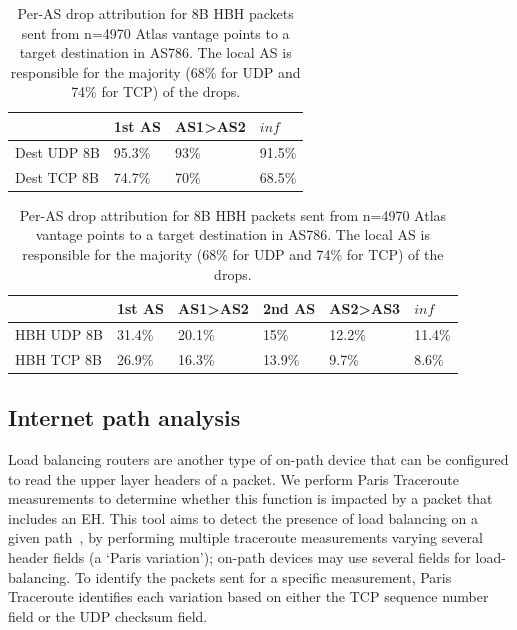 \documentclass[conference]{IEEEtran}
\begin{document}
\begin{table}
\centering
\caption{Per-AS drop attribution for 8B DST packets sent from n=4970 Atlas vantage points to a target destination in AS786. The local AS is responsible for the majority (5\% for UDP and 25\% for TCP) of the drops.}
 \label{tbl:uk_as1}

\begin{tabular}{l|l|l|l}
                                   & 1st AS & AS1\textgreater AS2 & $inf $     \\ \hline 

{Dest UDP 8B} & 95.3\% & 93\%                 & 91.5\% \\ \hline

{Dest TCP 8B} & 74.7\% & 70\%                 & 68.5\%
\end{tabular}
\bigskip
\caption{Per-AS drop attribution for 8B HBH packets sent from n=4970  Atlas vantage points to a target destination in AS786. The local AS is responsible for the majority (68\% for UDP and 74\% for TCP) of the drops.}
\begin{tabular}{p{}|l|l|l|l|l}

              & 1st AS & AS1\textgreater{}AS2 & 2nd AS & AS2\textgreater{}AS3 & $inf$     \\ \hline
HBH UDP 8B & 31.4\% & 20.1\%               & 15\%   & 12.2\%               & 11.4\% \\ \hline
HBH TCP 8B & 26.9\% & 16.3\%               & 13.9\% & 9.7\%                & 8.6\%  \\ 
\end{tabular}
 \label{tbl:uk_as2}
\end{table}


\subsection{Internet path analysis}

Load balancing routers are another type of on-path device that can be configured to read  the upper layer headers of a packet. We perform Paris Traceroute measurements to determine whether this function is impacted by a packet that includes an EH. This tool aims to detect the presence of load balancing on a given path~\cite{augustin2006avoiding}, by performing multiple traceroute measurements varying several header fields (a `Paris variation'); on-path devices may use several fields for load-balancing. To identify the packets sent for a specific measurement, Paris Traceroute identifies each variation based on either the TCP sequence number field or the UDP checksum field.
\end{document}
